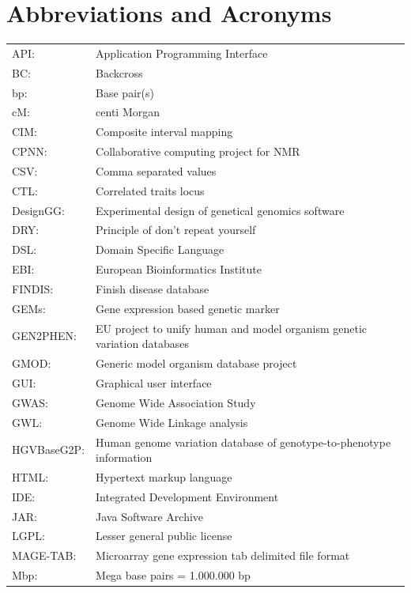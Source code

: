 \section*{Abbreviations and Acronyms}
{\footnotesize
\begin{tabular}{ l l }
API:         & Application Programming Interface\\
BC:          & Backcross \\
bp:          & Base pair(s) \\
cM:          & centi Morgan \\
CIM:         & Composite interval mapping \\
CPNN:        & Collaborative computing project for NMR\\
CSV:         & Comma separated values\\
CTL:         & Correlated traits locus \\
DesignGG:    & Experimental design of genetical genomics software\\
DRY:         & Principle of don't repeat yourself\\
DSL:         & Domain Specific Language\\
EBI:         & European Bioinformatics Institute\\
FINDIS:      & Finish disease database\\
GEMs:        & Gene expression based genetic marker\\
GEN2PHEN:    & EU project to unify human and model organism genetic variation databases\\
GMOD:        & Generic model organism database project\\
GUI:         & Graphical user interface\\
GWAS:        & Genome Wide Association Study\\
GWL:         & Genome Wide Linkage analysis\\
HGVBaseG2P:  & Human genome variation database of genotype-to-phenotype information\\
HTML:        & Hypertext markup language\\
IDE:         & Integrated Development Environment\\
JAR:         & Java Software Archive\\
LGPL:        & Lesser general public license\\
MAGE-TAB:    & Microarray gene expression tab delimited file format\\
Mbp:         & Mega base pairs = 1.000.000 bp \\

\end{tabular}}
